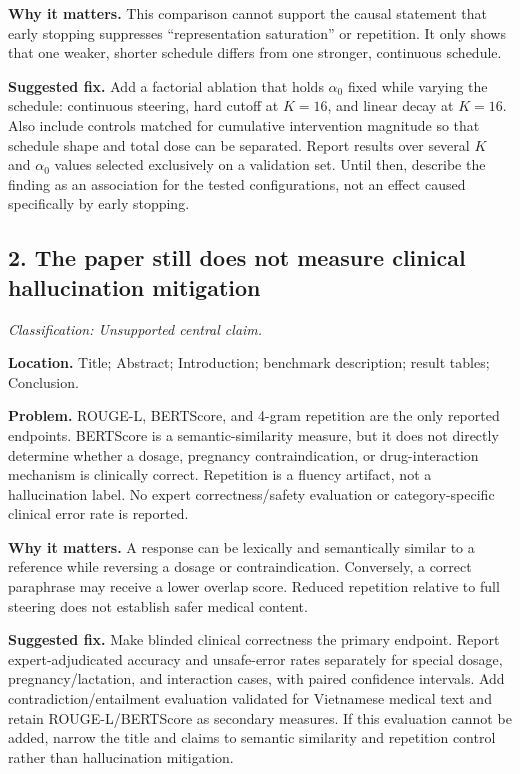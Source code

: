 \documentclass[11pt]{article}
\newcommand{\findinglabel}[1]{\textbf{#1}}
\newcommand{\classification}[1]{\textit{Classification: #1.}}
\begin{document}
\findinglabel{Why it matters.} This comparison cannot support the causal statement that early stopping suppresses ``representation saturation'' or repetition.  It only shows that one weaker, shorter schedule differs from one stronger, continuous schedule.

\findinglabel{Suggested fix.} Add a factorial ablation that holds $\alpha_0$ fixed while varying the schedule: continuous steering, hard cutoff at $K=16$, and linear decay at $K=16$.  Also include controls matched for cumulative intervention magnitude so that schedule shape and total dose can be separated.  Report results over several $K$ and $\alpha_0$ values selected exclusively on a validation set.  Until then, describe the finding as an association for the tested configurations, not an effect caused specifically by early stopping.

\subsection*{2. The paper still does not measure clinical hallucination mitigation}

\classification{Unsupported central claim}

\findinglabel{Location.} Title; Abstract; Introduction; benchmark description; result tables; Conclusion.

\findinglabel{Problem.} ROUGE-L, BERTScore, and 4-gram repetition are the only reported endpoints.  BERTScore is a semantic-similarity measure, but it does not directly determine whether a dosage, pregnancy contraindication, or drug-interaction mechanism is clinically correct.  Repetition is a fluency artifact, not a hallucination label.  No expert correctness/safety evaluation or category-specific clinical error rate is reported.

\findinglabel{Why it matters.} A response can be lexically and semantically similar to a reference while reversing a dosage or contraindication.  Conversely, a correct paraphrase may receive a lower overlap score.  Reduced repetition relative to full steering does not establish safer medical content.

\findinglabel{Suggested fix.} Make blinded clinical correctness the primary endpoint.  Report expert-adjudicated accuracy and unsafe-error rates separately for special dosage, pregnancy/lactation, and interaction cases, with paired confidence intervals.  Add contradiction/entailment evaluation validated for Vietnamese medical text and retain ROUGE-L/BERTScore as secondary measures.  If this evaluation cannot be added, narrow the title and claims to semantic similarity and repetition control rather than hallucination mitigation.
\end{document}
